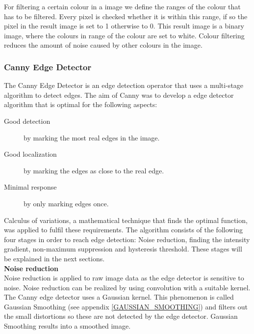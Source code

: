 \documentclass[a4paper]{article}
\begin{document}
For filtering a certain colour in a image we define the ranges of the colour that has to be filtered. Every pixel is checked whether it is within this range, if so the pixel in the result image is set to 1 otherwise to 0. This result image is a binary image, where the colours in range of the colour are set to white. Colour filtering reduces the amount of noise caused by other colours in the image.

\subsubsection{Canny Edge Detector}
The Canny Edge Detector \cite{Canny1986} is an edge detection operator that uses a multi-stage algorithm to detect edges. The aim of Canny was to develop a edge detector algorithm that is optimal for the following aspects:
\begin{description}
\item[Good detection] by marking the most real edges in the image.
\item[Good localization] by marking the edges as close to the real edge.
\item[Minimal response] by only marking edges once.
\end{description}
Calculus of variations, a mathematical technique that finds the optimal function, was applied to fulfil these requirements. The algorithm consists of the following four stages in order to reach edge detection: Noise reduction, finding the intensity gradient, non-maximum suppression and hysteresis threshold. These stages will be explained in the next sections.\\

\noindent\textbf{Noise reduction}\\
Noise reduction is applied to raw image data as the edge detector is sensitive to noise. Noise reduction can be realized by using convolution with a suitable kernel. The Canny edge detector uses a Gaussian kernel. This phenomenon is called Gaussian Smoothing (see appendix \ref{GAUSSIAN_SMOOTHING}) and filters out the small distortions so these are not detected by the edge detector. Gaussian Smoothing results into a smoothed image.\\
\end{document}
